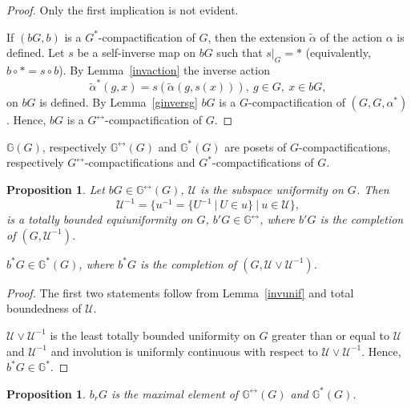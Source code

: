 \documentclass{amsart}
\newtheorem{pro}[thm]{Proposition}
\begin{document}
\begin{proof} 
Only the first implication is not evident. 

If $(b G, b)$ is a $G^*$-compactification of $G$, then the extension $\tilde\alpha$ of the action $\alpha$ is defined. Let $s$ be a self-inverse map on $b G$ such that $s|_{G}=*$ (equivalently, $b\circ *=s\circ b$).  By Lemma~\ref{invaction}  the inverse action 
$$\tilde\alpha^* (g, x)=s(\tilde\alpha (g, s(x))),\ g\in G,\ x\in b G,$$
on $b G$ is defined. By Lemma~\ref{ginversg} $b G$ is a $G$-compactification of $(G, G, \alpha^*)$. Hence, $b G$ is a $G^{\leftrightarrow}$-compactification of $G$. 
\end{proof}

$\mathbb{G} (G)$, respectively $\mathbb{G}^{\leftrightarrow} (G)$ and $\mathbb{G}^* (G)$ are posets of $G$-compactifications, respectively $G^{\leftrightarrow}$-compactifications and $G^*$-compactifications of $G$.

\begin{pro}\label{coinunif}
Let $b G\in\mathbb{G}^{\leftrightarrow}(G)$, $\mathcal U$ is the subspace uniformity on $G$. Then 
$$\mathcal U^{-1}=\{u^{-1}=\{U^{-1}\ |\ U\in u\}\ |\ u\in\mathcal U\},$$
is a totally bounded equiuniformity on $G$, $b' G\in\mathbb{G}^{\leftrightarrow}$, where $b' G$ is the completion of $(G, \mathcal U^{-1})$. 

$b^* G\in\mathbb{G}^*(G)$, where $b^* G$ is the completion of $(G, \mathcal U\vee\mathcal U^{-1})$. 
\end{pro}

\begin{proof}
The first two statements follow from Lemma~\ref{invunif} and total boundedness of $\mathcal U$. 

$\mathcal U\vee\mathcal U^{-1}$ is the least totally bounded uniformity on $G$ greater than or equal to $\mathcal U$ and $\mathcal U^{-1}$ and involution is uniformly continuous with respect to $\mathcal U\vee\mathcal U^{-1}$. Hence, $b^* G\in\mathbb{G}^*$. 
\end{proof}

\begin{pro}\label{blrlck}
$b_r G$ is the maximal element of $\mathbb{G}^{\leftrightarrow} (G)$ and $\mathbb{G}^* (G)$.
\end{pro}
\end{document}
